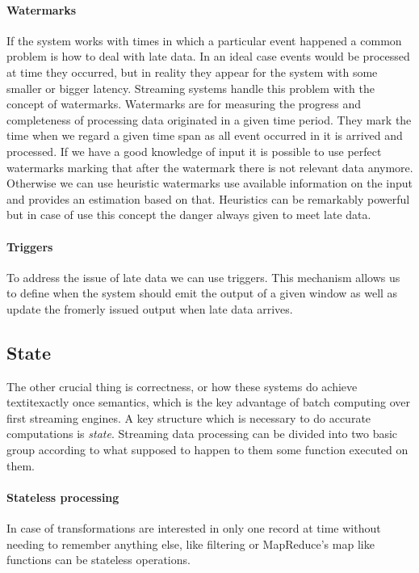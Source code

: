 \paragraph{Watermarks}If the system works with times in which a particular event happened a common problem is how to deal with late data. In an ideal case events would be processed at time they occurred, but in reality they appear for the system with some smaller or bigger latency. Streaming systems handle this problem with the concept of watermarks. Watermarks are for measuring the progress and completeness of processing data originated in a given time period. They mark the time when we regard a given time span as all event occurred in it is arrived and processed. If we have a good knowledge of input it is possible to use perfect watermarks marking that after the watermark there is not relevant data anymore. Otherwise we can use heuristic watermarks use available information on the input and provides an estimation based on that.
Heuristics can be remarkably powerful but in case of use this concept the danger always given to meet late data. 

\paragraph{Triggers} To address the issue of late data we can use triggers. This mechanism allows us to define when the system should emit the output of a given window as well as update the fromerly issued output when late data arrives. \cite{102}
    
\subsection{State}
The other crucial thing is correctness, or how these systems do achieve textit{exactly once semantics}, which is the key advantage of batch computing over first streaming engines. A key structure which is necessary to do accurate computations is \textit{state}.
Streaming data processing can be divided into two basic group according to what supposed to happen to them some function executed on them. 
\paragraph{Stateless processing} In case of transformations are interested in only one record at time without needing to remember anything else, like filtering or MapReduce's map like functions can be stateless operations. \cite{localstate}
